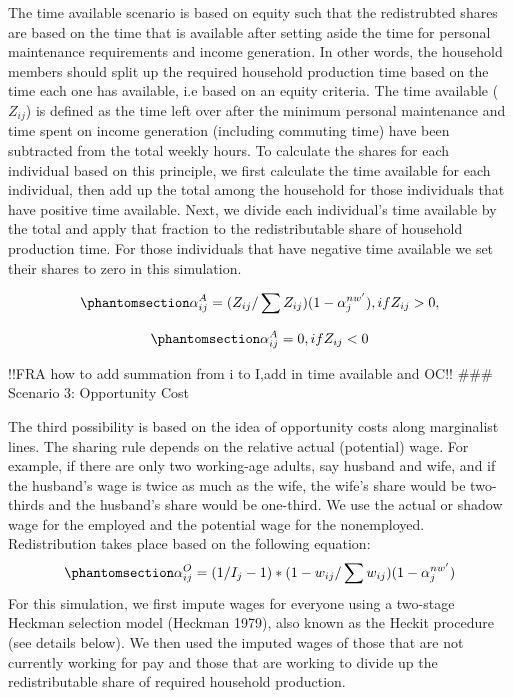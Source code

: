 \documentclass[
  11pt,
]{article}
\begin{document}
The time available scenario is based on equity such that the
redistrubted shares are based on the time that is available after
setting aside the time for personal maintenance requirements and income
generation. In other words, the household members should split up the
required household production time based on the time each one has
available, i.e based on an equity criteria. The time available
(\(Z_{ij}\)) is defined as the time left over after the minimum personal
maintenance and time spent on income generation (including commuting
time) have been subtracted from the total weekly hours. To calculate the
shares for each individual based on this principle, we first calculate
the time available for each individual, then add up the total among the
household for those individuals that have positive time available. Next,
we divide each individual's time available by the total and apply that
fraction to the redistributable share of household production time. For
those individuals that have negative time available we set their shares
to zero in this simulation.

\begin{equation}\phantomsection\label{eq-r2}{\alpha_{ij}^A= (Z_{ij}/ \sum Z_{ij}) (1-\alpha_{j}^{nw'}), if  Z_{ij}>0, 
}\end{equation}

\begin{equation}\phantomsection\label{eq-r3}{\alpha_{ij}^A =0, if Z_{ij}<0
}\end{equation}

!!FRA how to add summation from i to I,add in time available and OC!!
\#\#\# Scenario 3: Opportunity Cost

The third possibility is based on the idea of opportunity costs along
marginalist lines. The sharing rule depends on the relative actual
(potential) wage. For example, if there are only two working-age adults,
say husband and wife, and if the husband's wage is twice as much as the
wife, the wife's share would be two-thirds and the husband's share would
be one-third. We use the actual or shadow wage for the employed and the
potential wage for the nonemployed. Redistribution takes place based on
the following equation:
\begin{equation}\phantomsection\label{eq-r3}{\alpha_{ij}^O= (1/{I_j-1})*(1-w_{ij}/\sum w_{ij} ) (1-\alpha_{j}^{nw'})
}\end{equation} For this simulation, we first impute wages for everyone
using a two-stage Heckman selection model (Heckman 1979), also known as
the Heckit procedure (see details below). We then used the imputed wages
of those that are not currently working for pay and those that are
working to divide up the redistributable share of required household
production.
\end{document}
